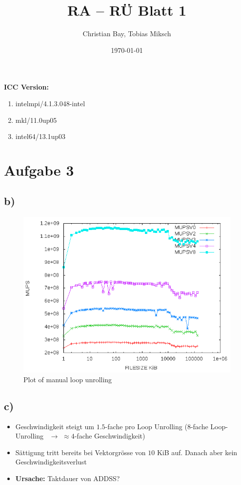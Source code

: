 \documentclass{article}
\title{RA -- R\"U Blatt 1}
\author{Christian Bay, Tobias Miksch}
\date{\today}
\begin{document}
\maketitle

\textbf{ICC Version:}
\begin{enumerate}
	\item intelmpi/4.1.3.048-intel
	\item mkl/11.0up05
	\item intel64/13.1up03
\end{enumerate}

\vspace*{6pt}

\section*{Aufgabe 3}
\subsection*{b)}

\begin{center}
	\begin{figure}[h]
	\includegraphics[scale=0.6]{pics/a3b.png}
	\caption{Plot of manual loop unrolling}
	\end{figure}
\end{center}

\subsection*{c)}
\begin{itemize}
	\item Geschwindigkeit steigt um $1.5$-fache pro Loop Unrolling ($8$-fache Loop-Unrolling \
		$\rightarrow$ $\approx4$-fache Geschwindigkeit)
	\item Sättigung tritt bereits bei Vektorgr\"osse von $10$ KiB auf. Danach aber kein
		Geschwindigkeitsverlust
	\item \textbf{Ursache:} Taktdauer von ADDSS?
\end{itemize}
\end{document}
